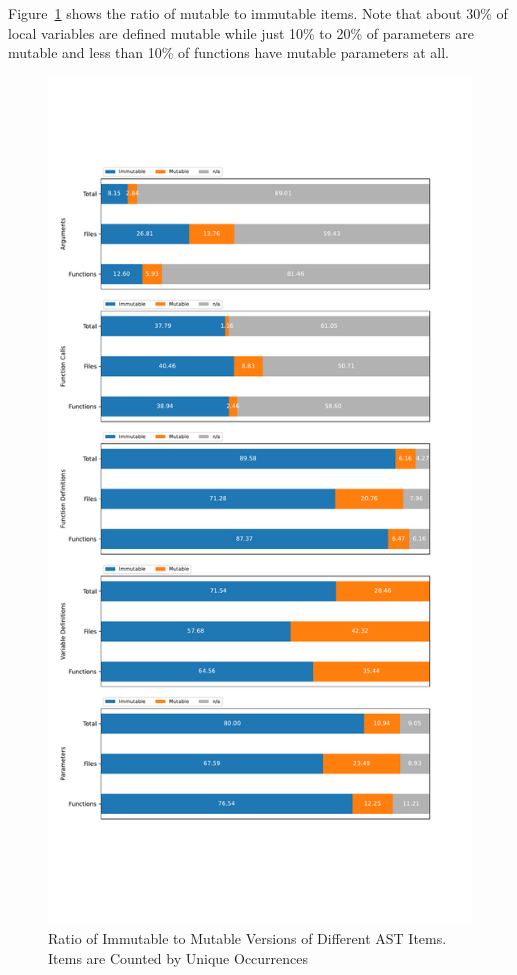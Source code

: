 \documentclass[11pt]{article}
\begin{document}
\begin{appendices}
Figure~\ref{fig:mutabillity_by_category} shows the ratio of mutable to immutable items. Note that about 30\% of local variables are defined mutable while just 10\% to 20\% of parameters are mutable and less than 10\% of functions have mutable parameters at all.

\begin{figure}[H]
	\centering
	\includegraphics[width=0.9\linewidth, clip, trim={0.5cm 6cm 0.5cm 6cm}]{../mutability_by_category.pdf}
	\caption{Ratio of Immutable to Mutable Versions of Different AST Items. Items are Counted by Unique Occurrences}
	\label{fig:mutabillity_by_category}
\end{figure}


\end{appendices}


\printbibliography
\end{document}
